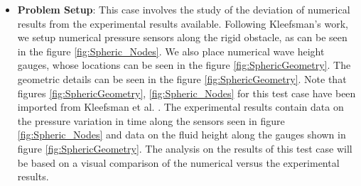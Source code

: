 \documentclass{../GPUSPHtemplate}
\begin{document}
\begin{itemize}
\item \textbf{Problem Setup}: This case involves the study of the deviation of numerical results from the experimental results available.
  Following Kleefsman's work, we setup numerical pressure sensors along the rigid obstacle, as can be seen in the figure \ref{fig:Spheric_Nodes}.
  We also place numerical wave height gauges, whose locations can be seen in the figure \ref{fig:SphericGeometry}.
  The geometric details can be seen in the figure \ref{fig:SphericGeometry}. Note that figures \ref{fig:SphericGeometry},
  \ref{fig:Spheric_Nodes} for this test case have been imported from Kleefsman et al. \citep{Kleefsman}.
  The experimental results contain data on the pressure variation in time along the sensors seen in figure \ref{fig:Spheric_Nodes}
  and data on the fluid height along the gauges shown in figure \ref{fig:SphericGeometry}. The analysis on the results of this
  test case will be based on a visual comparison of the numerical versus the experimental results.    
  

\end{itemize}
\end{document}
